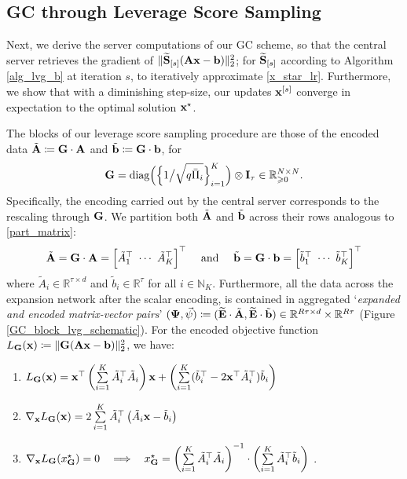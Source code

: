 \documentclass[journal,letterpaper,onecolumn,twoside,nofonttune]{IEEEtran}
\newcommand{\N}{\mathbb{N}}
\newcommand{\R}{\mathbb{R}}
\newcommand{\bb}{\bold{b}}
\newcommand{\xb}{\bold{x}}
\newcommand{\Ab}{\bold{A}}
\newcommand{\Ebwt}{\widetilde{\bold{E}}}
\newcommand{\Gb}{\bold{G}}
\newcommand{\Ib}{\bold{I}}
\newcommand{\Sb}{\bold{S}}
\newcommand{\Sbwt}{\widetilde{\Sb}}
\newcommand{\At}{\tilde{A}}
\newcommand{\Abt}{\tilde{\Ab}}
\newcommand{\bt}{\tilde{b}}
\newcommand{\bbt}{\tilde{\bb}}
\newcommand{\Pib}{\bar{\Pi}}
\newcommand{\PsiB}{\bold{\Psi}}
\newcommand{\psiv}{\vec{\psi}}
\newcommand{\diag}{\mathrm{diag}}
\begin{document}
\subsection{GC through Leverage Score Sampling}
\label{sk_lin_regr}
 
Next, we derive the server computations of our GC scheme, so that the central server retrieves the gradient of $\|\Sbwt_{[s]}(\Ab\xb-\bb)\|_2^2$; for $\Sbwt_{[s]}$ according to Algorithm \ref{alg_lvg_b} at iteration $s$, to iteratively approximate \eqref{x_star_lr}. Furthermore, we show that with a diminishing step-size, our updates $\xb^{[s]}$ converge in expectation to the optimal solution $\xb^\star$.

The blocks of our leverage score sampling procedure are those of the encoded data $\Abt\coloneqq\Gb\cdot\Ab$ and $\bbt\coloneqq\Gb\cdot\bb$, for
\begin{equation}
\label{scalar_enc_matrix}
  \Gb=\diag\Big(\Big\{1\big/\sqrt{q\Pib_i}\Big\}_{i=1}^K\Big)\otimes\Ib_\tau\in\R_{\geqslant0}^{N\times N} .
\end{equation}
Specifically, the encoding carried out by the central server corresponds to the rescaling through $\Gb$. We partition both $\Abt$ and $\bbt$ across their rows analogous to \eqref{part_matrix}:
\begin{equation}
\label{part_matr_expr_LR}
  \Abt=\Gb\cdot\Ab=\Big[\At_1^\top \ \cdots \ \At_K^\top\Big]^\top \quad \text{ and } \quad \bbt=\Gb\cdot\bb=\Big[\bt_1^\top \ \cdots \ \bt_K^\top\Big]^\top
\end{equation}
where $\At_i\in\R^{{\tau}\times d}$ and $\bt_i\in\R^{\tau}$ for all $i\in\N_K$. Furthermore, all the data across the expansion network after the scalar encoding, is contained in aggregated `\textit{expanded and encoded matrix-vector pairs}' $(\PsiB,\psiv)\coloneqq(\Ebwt\cdot\Abt,\Ebwt\cdot\bbt)\in\R^{R\tau\times d}\times\R^{R\tau}$ (Figure \ref{GC_block_lvg_schematic}). For the encoded objective function $L_{\Gb}(\xb)\coloneqq\|\Gb(\Ab\xb-\bb)\|_2^2$, we have:
\begin{enumerate}[label=(\roman*)]
  \item $L_{\Gb}(\xb)=\xb^\top\left(\sum\limits_{i=1}^K\At_i^\top\At_i\right)\xb+\left(\sum\limits_{i=1}^K(\bt_i^\top-2\xb^\top\At_i^\top)\bt_i\right)$
  \item $\nabla_{\xb}L_{\Gb}(\xb)=2\sum\limits_{i=1}^K\At_i^\top\left(\At_i\xb-\bt_i\right)$
  \item $\nabla_{\xb}L_{\Gb}(x_\Gb^\star)=0 \ \ \implies \ \ x_\Gb^\star=\left(\sum\limits_{i=1}^K\At_i^\top\At_i\right)^{-1}\cdot\left(\sum\limits_{i=1}^K\At_i^\top\bt_i\right)\ $.
\end{enumerate}
\end{document}
